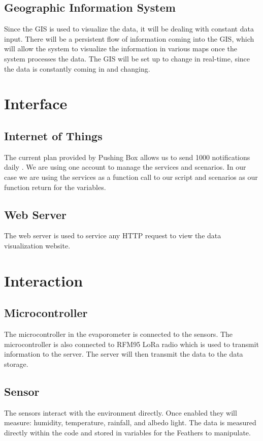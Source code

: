 \documentclass[onecolumn, draftclsnofoot,10pt, compsoc]{IEEEtran}
\begin{document}
\subsection{Geographic Information System}
Since the GIS is used to visualize the data, it will be dealing with constant data input. There will be a persistent flow of information coming into the GIS, which will allow the system to visualize the information in various maps once the system processes the data\cite{t3}. The GIS will be set up to change in real-time, since the data is constantly coming in and changing. 


\section{Interface}
\subsection{Internet of Things}
The current plan provided by Pushing Box allows us to send 1000 notifications daily \cite{t4}.  We are using one account to manage the services and scenarios.  In our case we are using the services as a function call to our script and scenarios as our function return for the variables.

\subsection{Web Server}
The web server is used to service any HTTP request to view the data visualization website.

\section{Interaction}
\subsection{Microcontroller}
The microcontroller in the evaporometer is connected to the sensors. The microcontroller is also connected to RFM95 LoRa radio which is used to transmit information to the server. The server will then transmit the data to the data storage. 

\subsection{Sensor}
The sensors interact with the environment directly.  Once enabled they will measure: humidity, temperature, rainfall, and  albedo light.  The data is measured directly within the code and stored in variables for the Feathers to manipulate.
\end{document}
